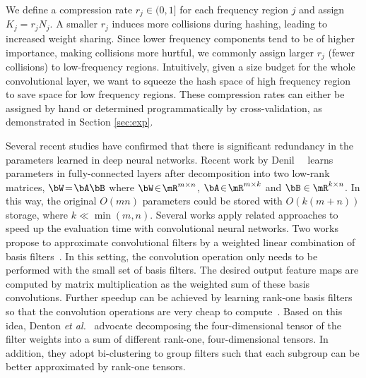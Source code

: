 \documentclass{article} %
\begin{document}
We define a compression rate  $r_j\!\in\!(0,1]$ for each frequency region $j$ and assign $K_j\!=\!r_j N_j$.
A smaller $r_j$ induces more collisions during hashing, leading to increased weight sharing.
Since lower frequency components tend to be of higher importance, making collisions more hurtful, we commonly assign larger $r_j$ (fewer collisions) to low-frequency regions.
Intuitively, given a size budget for the whole convolutional layer, we want to squeeze the hash space of high frequency region to save space for low frequency regions.
These compression rates can either be assigned by hand or determined programmatically by cross-validation, as demonstrated in Section \ref{sec:exp}. 

Several recent studies have confirmed that there is significant redundancy in the parameters learned in deep neural networks.
Recent work by Denil~\etal{}~\cite{denil2013predicting} learns parameters in fully-connected layers after decomposition into two low-rank matrices, \ie{}$\bW\!=\!\bA\bB$ where $\bW\!\in\!\mR^{m\times n}$, $\bA\!\in\!\mR^{m\times k}$ and $\bB\in \mR^{k\times n}$.
In this way, the original $O(m n)$ parameters could be stored with $O(k(m+n))$ storage, where $k\ll \min(m,n)$.
Several works apply related approaches to speed up the evaluation time with convolutional neural networks.
Two works propose to approximate convolutional filters by a weighted linear combination of basis filters~\cite{rigamonti2013learning,jaderberg2014speeding}.
In this setting, the convolution operation only needs to be performed with the small set of basis filters.
The desired output feature maps are computed by matrix multiplication as the weighted sum of these basis convolutions.
Further speedup can be achieved by learning rank-one basis filters so that the convolution operations are very cheap to compute~\cite{denton2014exploiting,lebedev2014speeding}.
Based on this idea, Denton \emph{et al.}~\cite{denton2014exploiting} advocate decomposing the four-dimensional tensor of the filter weights into a sum of different rank-one, four-dimensional tensors.
In addition, they adopt bi-clustering to group filters such that each subgroup can be better approximated by rank-one tensors.
\end{document}
